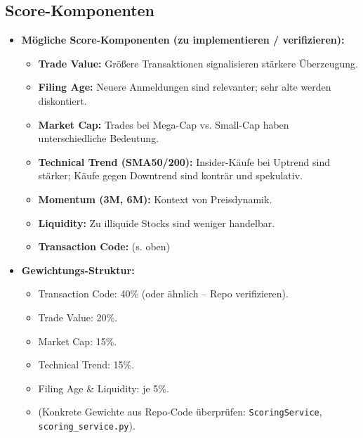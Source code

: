 \subsection{Score-Komponenten}
\begin{itemize}
  \item \textbf{Mögliche Score-Komponenten (zu implementieren / verifizieren):} %
    \begin{itemize}
      \item \textbf{Trade Value:} Größere Transaktionen signalisieren stärkere Überzeugung.
      \item \textbf{Filing Age:} Neuere Anmeldungen sind relevanter; sehr alte werden diskontiert.
      \item \textbf{Market Cap:} Trades bei Mega-Cap vs. Small-Cap haben unterschiedliche Bedeutung. %
      \item \textbf{Technical Trend (SMA50/200):} Insider-Käufe bei Uptrend sind stärker; Käufe gegen Downtrend sind konträr und spekulativ.
      \item \textbf{Momentum (3M, 6M):} Kontext von Preisdynamik.
      \item \textbf{Liquidity:} Zu illiquide Stocks sind weniger handelbar.
      \item \textbf{Transaction Code:} (s. oben)
    \end{itemize}
  \item \textbf{Gewichtungs-Struktur:} %
    \begin{itemize}
      \item Transaction Code: 40\% (oder ähnlich -- Repo verifizieren).
      \item Trade Value: 20\%.
      \item Market Cap: 15\%.
      \item Technical Trend: 15\%.
      \item Filing Age \& Liquidity: je 5\%.
      \item (Konkrete Gewichte aus Repo-Code überprüfen: \texttt{ScoringService}, \texttt{scoring\_service.py}). %
    \end{itemize}
\end{itemize}

